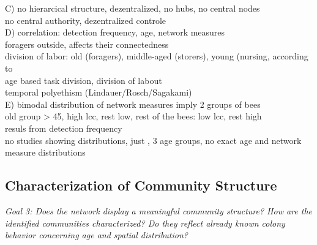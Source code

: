 C) no hierarcical structure, dezentralized, no hubs, no central nodes\\
no central authority, dezentralized controle~\textcite{seeley1989honey}\\

D) correlation: detection frequency, age, network measures\\
foragers outside, affects their connectedness~\textcite{baracchi2014socio}\\
division of labor: old (foragers), middle-aged (storers), young (nursing, according to \textcite{seeley1989social}\\
age based task division, division of labout\\
temporal polyethism (Lindauer/Rosch/Sagakami)\\

E) bimodal distribution of network measures imply 2 groups of bees\\
old group > 45, high lcc, rest low, rest of the bees: low lcc, rest high\\
resuls from detection frequency\\
no studies showing distributions, just \cite{baracchi2014socio}, 3 age groups, no exact age and network measure distributions\\


\subsection{Characterization of Community Structure}
\emph{Goal 3:
Does the network display a meaningful community structure?
How are the identified communities characterized?
Do they reflect already known colony behavior concerning age and spatial distribution?}

